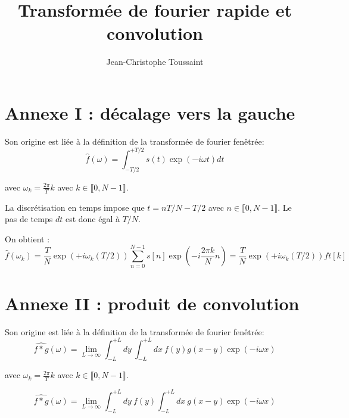 \documentclass[a4paper, 12pt]{article}
\begin{document}


\title{Transformée de fourier rapide et convolution}

\author{Jean-Christophe Toussaint
}
 
\maketitle

\section{Annexe I : décalage vers la gauche}

Son origine est liée à la définition de la transformée de fourier fenêtrée:
\begin{equation}
\hat{f}(\omega)=\int_{-T/2}^{+T/2} s(t) \exp \left(-i \omega t \right) dt
\end{equation}

avec $\omega_k=\frac{2 \pi}{T} k$ avec  $k \in  \llbracket  0, N-1 \rrbracket $.

La discrétisation en temps impose que $t=n T/N -T/2$ avec $n \in  \llbracket  0, N-1 \rrbracket $.
Le pas de temps $dt$ est donc égal à $T/N$.

On obtient :
\begin{equation}
\hat{f}(\omega_k)= \frac{T}{N} \exp \left(+i \omega_k (T/2) \right)  \sum_{n=0}^{N-1} s[n] \exp \left(-i \frac{2 \pi k}{N} n \right) =
\frac{T}{N} \exp \left(+i \omega_k (T/2) \right) ft [k]
\end{equation}

\section{Annexe II : produit de convolution}

Son origine est liée à la définition de la transformée de fourier fenêtrée:
\begin{equation}
\widehat{f*g}(\omega)=\lim_{L \rightarrow \infty} \int_{-L}^{+L} 
dy\ \int_{-L}^{+L}  dx\ 
f(y) g(x-y) \exp \left(-i \omega x \right) 
\end{equation}

avec $\omega_k=\frac{2 \pi}{T} k$ avec  $k \in  \llbracket  0, N-1 \rrbracket $.

\begin{equation}
\widehat{f*g}(\omega)=\lim_{L \rightarrow \infty} \int_{-L}^{+L} 
dy\  f(y)
\int_{-L}^{+L} dx\ 
g(x-y) \exp \left(-i \omega x \right) 
\end{equation}
\end{document}
